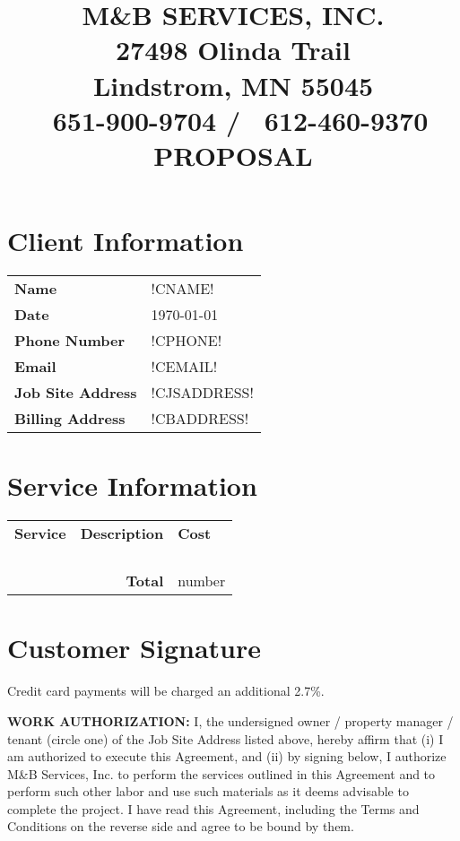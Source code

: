 \documentclass{article}
\title{\textbf{M\&B SERVICES, INC.}\\
    \large 27498 Olinda Trail \\
    Lindstrom, MN 55045 \\
    \Telefon\ 651-900-9704 / \fax\ 612-460-9370 \\
    \hfill \break 
    \textbf{PROPOSAL}}
\author{}
\date{}
\begin{document}
\maketitle

\section*{Client Information}

\begin{tabularx}{\textwidth}{p{100px} X}
    \textbf{Name} & !CNAME! \\
    \textbf{Date} & \today \\
    \textbf{Phone Number} & !CPHONE! \\
    \textbf{Email} & !CEMAIL! \\
    \textbf{Job Site Address} & !CJSADDRESS! \\
    \textbf{Billing Address} & !CBADDRESS! \\
\end{tabularx}

\section*{Service Information}

\begin{tabularx}{\textwidth}{p{100px} X p{50px}}
    \textbf{Service} & \textbf{Description} & \textbf{Cost} \\
     & & \\
     & & \\
     & & \\
     \hline \\
     \multicolumn{2}{r}{\textbf{Total}} & number\\
\end{tabularx}

\section*{Customer Signature}
Credit card payments will be charged an additional 2.7\%.\newline

\noindent \textbf{WORK AUTHORIZATION:} I, the undersigned owner / property manager / tenant (circle one) of the Job Site Address listed above, hereby affirm that (i) I am authorized to execute this Agreement, and (ii) by signing below, I authorize M\&B Services, Inc. to perform the services outlined in this Agreement and to perform such other labor and use such materials as it deems advisable to complete the project. I have read this Agreement, including the Terms and Conditions on the reverse side and agree to be bound by them.\\
\end{document}
